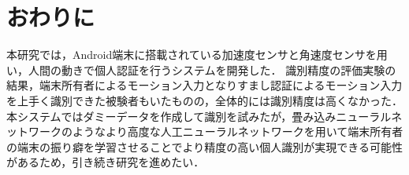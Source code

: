 \section{おわりに}
本研究では，Android端末に搭載されている加速度センサと角速度センサを用い，人間の動きで個人認証を行うシステムを開発した．
識別精度の評価実験の結果，端末所有者によるモーション入力となりすまし認証によるモーション入力を上手く識別できた被験者もいたものの，全体的には識別精度は高くなかった．
本システムではダミーデータを作成して識別を試みたが，畳み込みニューラルネットワークのようなより高度な人工ニューラルネットワークを用いて端末所有者の端末の振り癖を学習させることでより精度の高い個人識別が実現できる可能性があるため，引き続き研究を進めたい．
